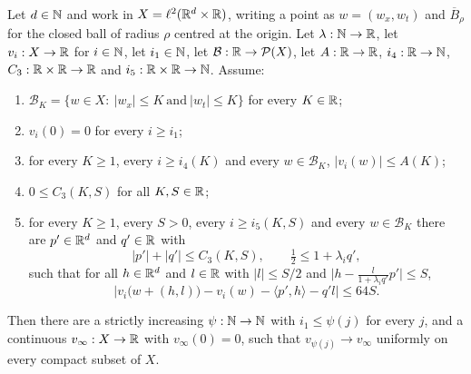 \begin{lemma}
Let $d\in\mathbb{N}$ and work in $X=\ell^2(\mathbb{R}^d\times\mathbb{R})$, writing a point as
$w=(w_x,w_t)$ and $\overline B_\rho$ for the closed ball of radius $\rho$
centred at the origin. Let $\lambda:\mathbb{N}\to\mathbb{R}$, let $v_i:X\to\mathbb{R}$ for $i\in\mathbb{N}$,
let $i_1\in\mathbb{N}$, let $\mathcal B:\mathbb{R}\to\mathcal P(X)$, let $A:\mathbb{R}\to\mathbb{R}$,
$i_4:\mathbb{R}\to\mathbb{N}$, $C_3:\mathbb{R}\times\mathbb{R}\to\mathbb{R}$ and $i_5:\mathbb{R}\times\mathbb{R}\to\mathbb{N}$. Assume:
\begin{enumerate}
\item\label{it:nles-box} $\mathcal B_K=\{w\in X:\ |w_x|\le K\ \text{and}\
|w_t|\le K\}$ for every $K\in\mathbb{R}$;
\item\label{it:nles-org} $v_i(0)=0$ for every $i\ge i_1$;
\item\label{it:nles-bd} for every $K\ge1$, every $i\ge i_4(K)$ and every
$w\in\mathcal B_K$, $|v_i(w)|\le A(K)$;
\item\label{it:nles-C} $0\le C_3(K,S)$ for all $K,S\in\mathbb{R}$;
\item\label{it:nles-fit} for every $K\ge1$, every $S>0$, every $i\ge i_5(K,S)$
and every $w\in\mathcal B_K$ there are $p'\in\mathbb{R}^d$ and $q'\in\mathbb{R}$ with
\[
  |p'|+|q'|\le C_3(K,S),\qquad \tfrac12\le1+\lambda_iq',
\]
such that for all $h\in\mathbb{R}^d$ and $l\in\mathbb{R}$ with $|l|\le S/2$ and
$\bigl|h-\frac{l}{1+\lambda_iq'}p'\bigr|\le S$,
\begin{equation}\label{eq:nles-inc}
  \bigl|v_i\bigl(w+(h,l)\bigr)-v_i(w)-\langle p',h\rangle-q'l\bigr|\le64S .
\end{equation}
\end{enumerate}
Then there are a strictly increasing $\psi:\mathbb{N}\to\mathbb{N}$ with $i_1\le\psi(j)$ for
every $j$, and a continuous $v_\infty:X\to\mathbb{R}$ with $v_\infty(0)=0$, such that
$v_{\psi(j)}\to v_\infty$ uniformly on every compact subset of $X$.
\end{lemma}
